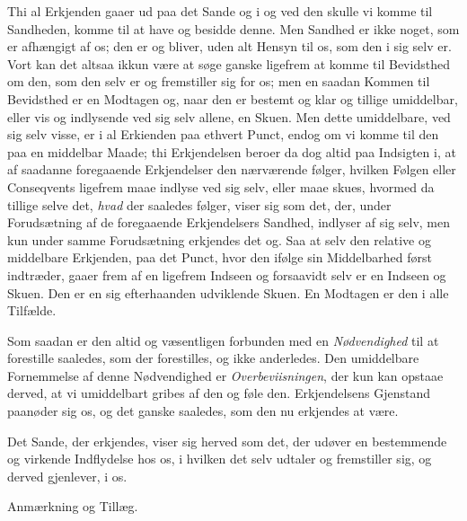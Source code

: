 \documentclass[12pt,a4paper]{book}
\newcommand{\apage}[1]{\marginnote{\footnotesize\textit{[#1]}}}
\begin{document}
Thi al Erkjenden gaaer ud paa det Sande og i og ved den skulle vi komme til
Sandheden, komme til at have og besidde denne. Men Sandhed er ikke noget, som
er afhængigt af os; den er og bliver, uden alt Hensyn til os, som den i sig
selv er. Vort kan det altsaa ikkun være at søge ganske ligefrem at komme til
Bevidsthed om den, som den selv er og fremstiller sig for os; men en saadan
Kommen til Bevidsthed er en Modtagen og, naar den er bestemt og klar og tillige
umiddelbar, eller vis og indlysende ved sig selv allene, en Skuen. Men dette
umiddelbare, ved sig selv visse, er i al Erkienden paa ethvert Punct, endog om
vi komme til den paa en middelbar Maade; thi Erkjendelsen beroer da dog altid
paa Indsigten i, at af saadanne foregaaende Erkjendelser den nærværende følger,
hvilken Følgen eller Conseqvents ligefrem maae indlyse ved sig selv, \apage{4} eller maae
skues, hvormed da tillige selve det, \emph{hvad} der saaledes følger, viser sig som
det, der, under Forudsætning af de foregaaende Erkjendelsers Sandhed, indlyser
af sig selv, men kun under samme Forudsætning erkjendes det og. Saa at selv den
relative og middelbare Erkjenden, paa det Punct, hvor den ifølge sin
Middelbarhed først indtræder, gaaer frem af en ligefrem Indseen og forsaavidt
selv er en Indseen og Skuen. Den er en sig efterhaanden udviklende Skuen. En
Modtagen er den i alle Tilfælde.

Som saadan er den altid og væsentligen forbunden med en \emph{Nødvendighed} til at
forestille saaledes, som der forestilles, og ikke anderledes. Den umiddelbare
Fornemmelse af denne Nødvendighed er \emph{Overbeviisningen}, der kun kan opstaae
derved, at vi umiddelbart gribes af den og føle den. Erkjendelsens Gjenstand
paanøder sig os, og det ganske saaledes, som den nu erkjendes at være.

Det Sande, der erkjendes, viser sig herved som det, der udøver en bestemmende
og virkende Indflydelse hos os, i hvilken det selv udtaler og fremstiller sig,
og derved gjenlever, i os.

\begin{center}Anmærkning og Tillæg.\end{center}
\end{document}
